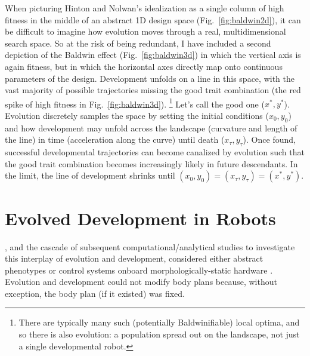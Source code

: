 When picturing Hinton and Nolwan's idealization as a single column of high fitness in the middle of an abstract 1D design space (Fig.~\ref{fig:baldwin2d}), it can be difficult to imagine how evolution moves through a real, multidimensional search space. 
So at the risk of being redundant, 
I have included a second depiction of the Baldwin effect (Fig.~\ref{fig:baldwin3d}) in which the vertical axis is again fitness, but in which the horizontal axes directly map onto continuous parameters of the design.
Development unfolds on a line in this space, with the vast majority of possible trajectories missing the good trait combination (the red spike of high fitness in Fig.~\ref{fig:baldwin3d}).%
\footnote{%
There are typically many such (potentially Baldwinifiable) local optima, and so there is also evolution: a population spread out on the landscape, not just a single developmental robot.%
} 
Let's call the good one ($x^*,y^*$).
Evolution discretely samples the space by setting the initial conditions ($x_0,y_0$) and how development may unfold across the landscape (curvature and length of the line) in time (acceleration along the curve) until death ($x_{\tau},y_{\tau}$).
Once found, successful developmental trajectories can become canalized by evolution such that the good trait combination becomes increasingly likely in future descendants.
In the limit, the line of development shrinks until $(x_0,y_0) = (x_{\tau},y_{\tau}) = (x^*,y^*)$.




\section{Evolved Development in Robots}


\citet{hinton1987learning}, and the cascade of subsequent computational/analytical studies to investigate this interplay of evolution and development,
considered either abstract phenotypes \cite{belew1989evolution,ackley1991interactions,nolfi1994learning,french1994genes,mayley1996landscapes,ancel1999quantitative,ancel2000undermining,sendhoff1999model,suzuki2004interactions,downing2004development,santos2015phenotypic,fernando2018meta,todd2020interaction}
or control systems onboard morphologically-static hardware \cite{floreano1996plastic,husbands1998better}.
Evolution and development could not modify body plans because, without exception, the body plan (if it existed) was fixed.

